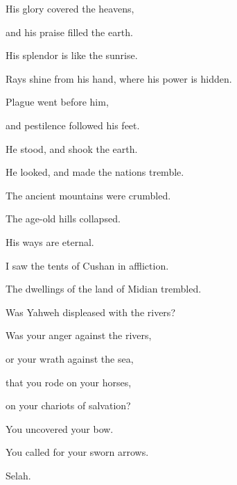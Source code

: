 {\par }
{\BB \par }{\Q His glory covered the heavens,
\par }{\QB and his praise filled the earth.
\par }{\Q {}His splendor is like the sunrise.
\par }{\QB Rays shine from his hand, where his power is hidden.
\par }{\Q {}Plague went before him,
\par }{\QB and pestilence followed his feet.
\par }{\Q {}He stood, and shook the earth.
\par }{\QB He looked, and made the nations tremble.
\par }{\QB The ancient mountains were crumbled.
\par }{\QB The age-old hills collapsed.
\par }{\QB His ways are eternal.
\par }{\Q {}I saw the tents of Cushan in affliction.
\par }{\QB The dwellings of the land of Midian trembled.
\par }{\Q {}Was Yahweh displeased with the rivers?
\par }{\QB Was your anger against the rivers,
\par }{\QB or your wrath against the sea,
\par }{\QB that you rode on your horses,
\par }{\QB on your chariots of salvation?
\par }{\Q {}You uncovered your bow.
\par }{\QB You called for your sworn arrows.
\par }{\QS Selah.\par }
